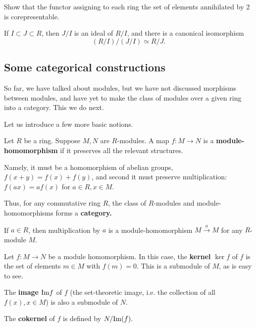 \begin{exercise} 
Show that the functor assigning to each ring the set of elements annihilated
by 2 is corepresentable. 
\end{exercise} 

\begin{exercise}
If $I \subset J \subset R$, then $J/I$ is an ideal of $R/I$, and there is a
canonical isomorphism
\[ (R/I)/(J/I) \simeq R/J.  \]
\end{exercise} 


\subsection{Some categorical constructions}
So far, we have talked about modules, but we have not discussed morphisms
between modules, and have yet to make the class of modules over a given ring
into a category. This we do next.

Let us introduce a  few more basic notions.

\begin{definition} 
Let $R$ be a ring.  Suppose $M,N$ are $R$-modules.  A map $f: M \to N$
is a \textbf{module-homomorphism} if it preserves all the relevant structures.

Namely, it must be a homomorphism of abelian groups, $f(x+y) = f(x) + f(y)$,
and second it must
preserve multiplication:
$f(ax)  = af(x)$ for $a \in R, x \in M$. 
\end{definition}


Thus, for any commutative ring $R$, the class of $R$-modules and
module-homomorphisms forms a \textbf{category.}

\begin{example} 
If $a \in R$, then multiplication by $a$ is a module-homomorphism $M
\stackrel{a}{\to} M$ for any $R$-module $M$.
\end{example} 

\begin{definition} Let $f: M \to N$ be a module homomorphism.
In this case, the \textbf{kernel} $\ker f$ of $f$ is  the set of elements $m
\in M$ with $f(m)=0$. This is
a submodule of $M$, as is easy to see. 

The \textbf{image} $\mathrm{Im} f$ of $f$ (the set-theoretic
image, i.e. the collection of all $f(x), x \in M$) is also a submodule of $N$. 

The
\textbf{cokernel} of $f$ is defined by
\(  N/\mathrm{Im}(f).  \) 
\end{definition}

